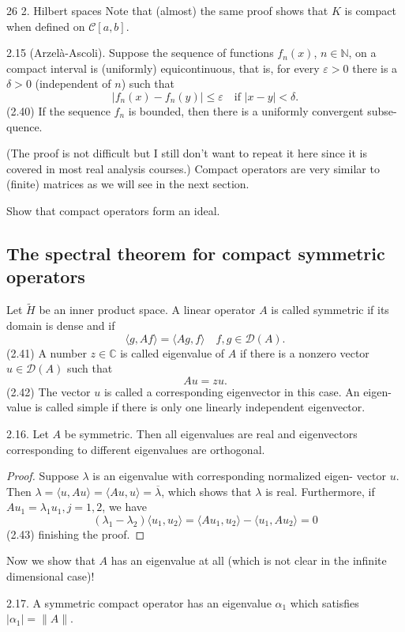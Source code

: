 26 2. Hilbert spaces
Note that (almost) the same proof shows that $K$ is compact when defined
on $\mathcal{C}[a, b]$.
\begin{theorem}{2.15 (Arzelà-Ascoli).}
Suppose the sequence of functions $f_n(x)$,
$n\in \mathbb{N}$, on a compact interval is (uniformly) equicontinuous, that is, for
every $\varepsilon > 0$ there is a $\delta > 0$ (independent of $n$) such that
$$|f_n(x) - f_n(y)| \leq \varepsilon \quad \text{if } |x - y| < \delta.$$
(2.40)
If the sequence $f_n$ is bounded, then there is a uniformly convergent subse-
quence.
\end{theorem}
(The proof is not difficult but I still don't want to repeat it here since it
is covered in most real analysis courses.)
Compact operators are very similar to (finite) matrices as we will see in
the next section.
\begin{problem}{}
Show that compact operators form an ideal.
\end{problem}
\subsection{The spectral theorem for compact
symmetric operators}
Let $\tilde{H}$ be an inner product space. A linear operator $A$ is called symmetric
if its domain is dense and if
$$\langle g, Af \rangle = \langle Ag, f \rangle \quad f, g \in \mathcal{D}(A).$$
(2.41)
A number $z \in \mathbb{C}$ is called eigenvalue of $A$ if there is a nonzero vector
$u \in \mathcal{D}(A)$ such that
$$Au = zu.$$
(2.42)
The vector $u$ is called a corresponding eigenvector in this case. An eigen-
value is called simple if there is only one linearly independent eigenvector.
\begin{theorem}{2.16.}
Let $A$ be symmetric. Then all eigenvalues are real and
eigenvectors corresponding to different eigenvalues are orthogonal.
\end{theorem}
\begin{proof}
Suppose $\lambda$ is an eigenvalue with corresponding normalized eigen-
vector $u$. Then $\lambda = \langle u, Au \rangle = \langle Au, u \rangle = \overline{\lambda}$, which shows that $\lambda$ is real.
Furthermore, if $A u_1 = \lambda_1 u_1, j = 1, 2$, we have
$$(\lambda_1 - \lambda_2)\langle u_1, u_2 \rangle = \langle A u_1, u_2 \rangle - \langle u_1, A u_2 \rangle = 0$$
(2.43)
finishing the proof.
\end{proof}
Now we show that $A$ has an eigenvalue at all (which is not clear in the
infinite dimensional case)!
\begin{theorem}{2.17.}
A symmetric compact operator has an eigenvalue $\alpha_1$ which
satisfies $|\alpha_1| = \|A\|$.
\end{theorem}